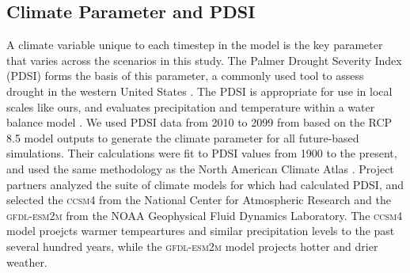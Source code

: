 

\subsection{Climate Parameter and PDSI}
A climate variable unique to each timestep in the model is the key parameter that varies across the scenarios in this study. The Palmer Drought Severity Index (PDSI) forms the basis of this parameter, a commonly used tool to assess drought in the western United States \citep{Cook2004}. The PDSI is appropriate for use in local scales like ours, and evaluates precipitation and temperature within a water balance model \citep{HeimJr2002}. We used PDSI data from 2010 to 2099 from \citet{Cook2014} based on the RCP 8.5 model outputs to generate the climate parameter for all future-based simulations. Their calculations were fit to PDSI values from 1900 to the present, and used the same methodology as the North American Climate Atlas \citep{Cook2004}. Project partners analyzed the suite of climate models for which \citet{Cook2014} had calculated PDSI, and selected the \textsc{ccsm4} from the National Center for Atmospheric Research and the \textsc{gfdl-esm2m} from the NOAA Geophysical Fluid Dynamics Laboratory. The \textsc{ccsm4} model proejcts warmer tempeartures and similar precipitation levels to the past several hundred years, while the \textsc{gfdl-esm2m} model projects hotter and drier weather. 

